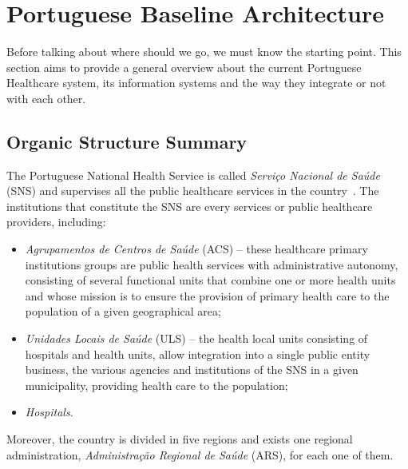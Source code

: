 \section{Portuguese Baseline Architecture}

Before talking about where should we go, we must know the starting point. This section aims to provide a general overview about the current Portuguese Healthcare system, its information systems and the way they integrate or not with each other.


\subsection{Organic Structure Summary}

The Portuguese National Health Service is called \textit{Serviço Nacional de Saúde} (SNS) and supervises all the public healthcare services in the country~\citep{SAUDE2011}. The institutions that constitute the SNS are every services or public healthcare providers, including:
\begin{itemize}
\item \textit{Agrupamentos de Centros de Saúde} (ACS) -- these healthcare primary institutions groups are public health services with administrative autonomy, consisting of several functional units that combine one or more health units and whose mission is to ensure the provision of primary health care to the population of a given geographical area;
\item \textit{Unidades Locais de Saúde} (ULS) -- the health local units consisting of hospitals and health units, allow integration into a single public entity business, the various agencies and institutions of the SNS in a given municipality, providing health care to the population;
\item \textit{Hospitals}.
\end{itemize}

Moreover, the country is divided in five regions and exists one regional administration, \textit{A\-dminis\-tra\-ção Regional de Saúde} (ARS), for each one of them.

